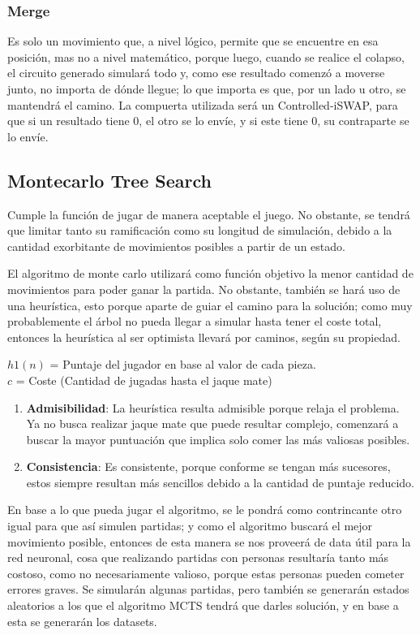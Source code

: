 \subsubsection{Merge}
Es solo un movimiento que, a nivel lógico, permite que se encuentre en esa posición, mas no a nivel matemático, porque luego, cuando se realice el colapso, el circuito generado simulará todo y, como ese resultado comenzó a moverse junto, no importa de dónde llegue; lo que importa es que, por un lado u otro, se mantendrá el camino. La compuerta utilizada será un Controlled-iSWAP, para que si un resultado tiene 0, el otro se lo envíe, y si este tiene 0, su contraparte se lo envíe.

\subsection{Montecarlo Tree Search}
Cumple la función de jugar de manera aceptable el juego. No obstante, se tendrá que limitar tanto su ramificación como su longitud de simulación, debido a la cantidad exorbitante de movimientos posibles a partir de un estado.

El algoritmo de monte carlo utilizará como función objetivo la menor cantidad de movimientos para poder ganar la partida. No obstante, también se hará uso de una heurística, esto porque aparte de guiar el camino para la solución; como muy probablemente el árbol no pueda llegar a simular hasta tener el coste total, entonces la heurística al ser optimista llevará por caminos, según su propiedad.\newline

$h1(n)$ = Puntaje del jugador en base al valor de cada pieza.\\

$c$ = Coste (Cantidad de jugadas hasta el jaque mate)

\begin{enumerate}
    \item \textbf{Admisibilidad}: La heurística resulta admisible porque relaja el problema. Ya no busca realizar jaque mate que puede resultar complejo, comenzará a buscar la mayor puntuación que implica solo comer las más valiosas posibles.
    \item \textbf{Consistencia}: Es consistente, porque conforme se tengan más sucesores, estos siempre resultan más sencillos debido a la cantidad de puntaje reducido.
\end{enumerate}

En base a lo que pueda jugar el algoritmo, se le pondrá como contrincante otro igual para que así simulen partidas; y como el algoritmo buscará el mejor movimiento posible, entonces de esta manera se nos proveerá de data útil para la red neuronal, cosa que realizando partidas con personas resultaría tanto más costoso, como no necesariamente valioso, porque estas personas pueden cometer errores graves. Se simularán algunas partidas, pero también se generarán estados aleatorios a los que el algoritmo MCTS tendrá que darles solución, y en base a esta se generarán los datasets.

